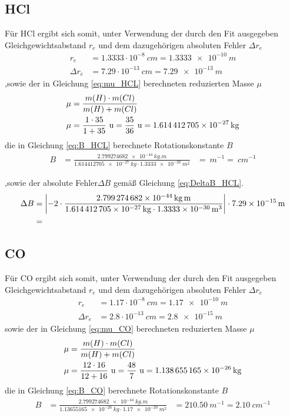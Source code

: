 \subsection*{HCl}
Für HCl ergibt sich somit, unter Verwendung der durch den Fit ausgegeben Gleichgewichtsabstand $r_e$ und dem dazugehörigen absoluten Fehler $\Delta r_e$
\begin{align}
\label{eq:re_HCL}
r_e &= 1.3333 \cdot 10^{-8} ~\si{cm}=\SI[mode=math]{1.3333e-10}{m}
\\
\Delta r_e &= 7.29 \cdot 10^{-13} ~\si{cm}=\SI[mode=math]{7.29e-13}{m}
\end{align}
,sowie der in Gleichung \ref{eq:mu_HCL} berechneten reduzierten Masse $\mu$
\begin{align}
\mu&= \frac{m(H)\cdot m(Cl)}{m(H)+m(Cl)}\notag\\
\mu&= \frac{1\cdot35}{1+35} ~\si{u}=\frac{35}{36}~\si{u}=\SI[mode=math]{1.614412705e-27}{kg}\label{eq:mu_HCL}
\end{align}
die in Gleichung \ref{eq:B_HCL} berechnete Rotationskonstante $B$
\begin{align}
\label{eq:B_HCL}
B &=\frac{\SI[mode=math]{2.799274682e-44}{kg.m}}{\SI[mode=math]{1.614412705e-27}{kg}\cdot\SI[mode=math]{1.3333e-20}{m^{2}}}
&=\SI[mode=math]{}{m^{-1}}
=\SI[mode=math]{}{cm^{-1}}
\end{align}


,sowie der absolute Fehler$\Delta B$  gemäß Gleichung  \ref{eq:DeltaB_HCL}.  
\begin{align}
\Delta B &= \left|-2\cdot \frac{\SI[mode=math]{2.799274682e-44}{kg.m}}{\SI[mode=math]{1.614412705e-27}{kg}\cdot\SI[mode=math]{1.3333e-30}{m^{3}}}\right| \cdot \SI[mode=math]{7.29e-15}{m}
\notag\\
&= \label{eq:DeltaB_HCL}
\end{align} 


\subsection*{CO}
Für CO ergibt sich somit, unter Verwendung der durch den Fit ausgegeben Gleichgewichtsabstand $r_e$ und dem dazugehörigen absoluten Fehler $\Delta r_e$
\begin{align}
\label{eq:r_CO}
r_e &= 1.17 \cdot 10^{-8} ~\si{cm}=\SI[mode=math]{1.17e-10}{m}
\\
\Delta r_e &= 2.8 \cdot 10^{-13} ~\si{cm}=\SI[mode=math]{2.8e-15}{m}
\end{align}
 sowie der in Gleichung \ref{eq:mu_CO} berechneten reduzierten Masse $\mu$
\begin{align}
\mu&= \frac{m(H)\cdot m(Cl)}{m(H)+m(Cl)}\notag\\
\mu&= \frac{12\cdot16}{12+16} ~\si{u}=\frac{48}{7}~\si{u}=\SI[mode=math]{1.138655165e-26}{kg}\label{eq:mu_CO}
\end{align}
die in Gleichung \ref{eq:B_CO} berechnete Rotationskonstante $B$
\begin{align}
\label{eq:B_CO}
B &=\frac{\SI[mode=math]{2.799274682e-44}{kg.m}}{\SI[mode=math]{1.13655165e-26}{kg}\cdot\SI[mode=math]{1.17e-20}{m^{2}}}
&=\SI[mode=math]{210.50}{m^{-1}}
=\SI[mode=math]{2.10}{cm^{-1}}
\end{align}


